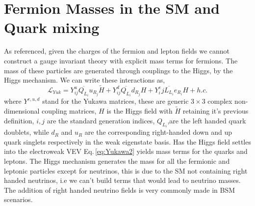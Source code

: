 \renewcommand{\cleardoublepage}{}
\renewcommand{\clearpage}{}

\section{Fermion Masses in the SM and Quark mixing}

As referenced, given the charges of the fermion and lepton fields we cannot construct a gauge invariant theory with explicit mass terms for fermions. 
%
The mass of these particles are generated through couplings to the Higgs, by the Higgs mechanism. We can write these interactions as,
%
\begin{equation} 
\label{eq:Yukawa2}
\mathcal{L}_{Yuk} = Y^u_{ij} \overline{Q_{L_i}} u_{R_j}  \tilde{H} + Y^d_{ij} \overline{Q_{L_i}}  d_{R_j} H  + Y^e_ij \overline{L_{L_i}}  e_{R_i} H + h.c. 
\end{equation} 
%
where $Y^{e,u,d}$ stand for the Yukawa matrices, these are generic $3\times3$ complex non-dimensional coupling matrices, $H$ is the Higgs field with $\tilde{H}$ retaining it's previous definition, $i,j$ are the standard generation indices, $Q_{L_i}$,are the left handed quark doublets, while $d_R$ and $u_R$ are the corresponding right-handed down and up quark singlets respectively in the weak eigenstate basis. 
%
Has the Higgs field settles into the electroweak VEV Eq.\,\ref{eq:Yukawa2} yields mass terms for the quarks and leptons. 
%
The Higgs mechanism generates the mass for all the fermionic and leptonic particles except for neutrinos, this is due to the SM not containing right handed neutrinos, i.e we can't build terms that would lead to neutrino masses.
% 
The addition of right handed neutrino fields is very commonly made in BSM scenarios. 

